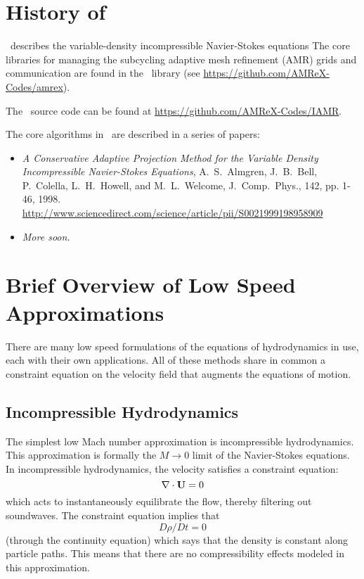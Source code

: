 \section{History of \iamr}

\iamr\ describes the variable-density incompressible Navier-Stokes equations
The core libraries for managing the subcycling adaptive mesh refinement (AMR)
grids and communication are found in the \amrex\ library
(see \url{https://github.com/AMReX-Codes/amrex}).

The \iamr\ source code can be found at
\url{https://github.com/AMReX-Codes/IAMR}.

The core algorithms in \iamr\ are described in a series of papers:
\begin{itemize}

\item {\it A Conservative Adaptive Projection Method for the Variable Density Incompressible Navier-Stokes Equations},
A.~S.~Almgren, J.~B.~Bell, P.~Colella, L.~H.~Howell, and M.~L.~Welcome,
J.~Comp.~Phys., 142, pp. 1-46, 1998.
\url{http://www.sciencedirect.com/science/article/pii/S0021999198958909} \cite{IAMR}

\item {\it More soon.}

\end{itemize}         

\section{Brief Overview of Low Speed Approximations}

There are many low speed formulations of the equations of hydrodynamics
in use, each with their own applications.  All of these methods share in
common a constraint equation on the velocity field that augments the
equations of motion.  

\subsection{Incompressible Hydrodynamics}

The simplest low Mach number approximation is incompressible
hydrodynamics. This approximation is formally the $M \rightarrow 0$
limit of the Navier-Stokes equations. In incompressible hydrodynamics,
the velocity satisfies a constraint equation:
\begin{equation}
\nabla \cdot {\bf U} = 0
\end{equation}
which acts to instantaneously equilibrate the flow, thereby filtering
out soundwaves.  The constraint equation implies that
\begin{equation}
D\rho/Dt = 0
\end{equation}
(through the continuity equation) which says that the density is
constant along particle paths. This means that there are no
compressibility effects modeled in this approximation.

